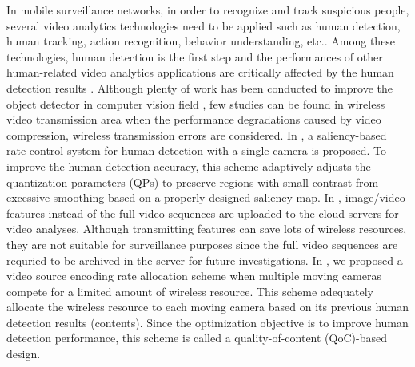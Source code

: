 \documentclass[journal]{IEEEtran}
\begin{document}
In mobile surveillance networks, in order to recognize and track suspicious people, several video analytics technologies need to be applied such as human detection, human tracking, action recognition, behavior understanding, etc.. Among these technologies, human detection is the first step and the performances of other human-related video analytics applications are critically affected by the human detection results \cite{LeHw15}. Although plenty of work has been conducted to improve the object detector in computer vision field \cite{DaTr05,LeLS08,FGMR10}, few studies can be found in wireless video transmission area when the performance degradations caused by video compression, wireless transmission errors are considered. In \cite{MiBR13}, a saliency-based rate control system for human detection with a single camera is proposed. To improve the human detection accuracy, this scheme adaptively adjusts the quantization parameters (QPs) to preserve regions with small contrast from excessive smoothing based on a properly designed saliency map. In \cite{GCCC11,ReCT12}, image/video features instead of the full video sequences are uploaded to the cloud servers for video analyses. Although transmitting features can save lots of wireless resources, they are not suitable for surveillance purposes since the full video sequences are requried to be archived in the server for future investigations. In \cite{CHLQ15}, we proposed a video source encoding rate allocation scheme when multiple moving cameras compete for a limited amount of wireless resource. This scheme adequately allocate the wireless resource to each moving camera based on its previous human detection results (contents). Since the optimization objective is to improve human detection performance, this scheme is called a quality-of-content (QoC)-based design.
\end{document}
